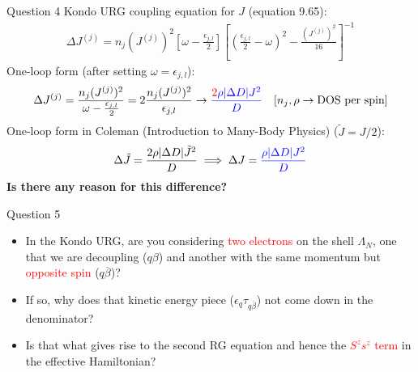 \documentclass[12pt,aspectratio=169]{beamer}
\newcommand{\qs}[1]{\textbf{\textcolor{bottlegreen}{#1}}}
\begin{document}
\begin{frame}{Question 4}
Kondo URG coupling equation for \(J\) (equation 9.65):
\begin{equation*}
\begin{aligned}
	\Delta J^{(j)}=n_{j}(J^{(j)})^{2}\left[\omega- \frac{\epsilon_{j,l}}{2}\right]\left[(\frac{\epsilon_{j,l}}{2}-\omega)^{2}-\frac{\left(J^{(j)}\right)^{2}}{16}\right]^{-1}
\end{aligned}
\end{equation*}
One-loop form (after setting \(\omega = \epsilon_{j,l}\)):
\begin{equation*}
\begin{aligned}
	\Delta J^{(j)}= \frac{n_{j}(J^{(j)})^{2}}{\omega-\frac{\epsilon_{j,l}}{2}} = 2\frac{n_{j}(J^{(j)})^{2}}{\epsilon_{j,l}} \rightarrow \textcolor{blue}{\frac{\textcolor{red}{2} \rho |\Delta D| J^2}{D}} && [n_j, \rho \rightarrow \text{DOS per spin}]
\end{aligned}
\end{equation*}
One-loop form in Coleman (Introduction to Many-Body Physics) (\(\tilde J = J/2\)):
\begin{equation*}
\begin{aligned}
	\Delta \tilde J = \frac{2 \rho |\Delta D| \tilde J^2}{D} \implies \Delta J = \textcolor{blue}{\frac{\rho |\Delta D| J^2}{D}}
\end{aligned}
\end{equation*}
\qs{Is there any reason for this difference?}
\end{frame}

\begin{frame}{Question 5}
	\begin{itemize}
		\item In the Kondo URG, are you considering \textcolor{red}{two electrons} on the shell \(\Lambda_N\), one that we are decoupling (\(q\beta\)) and another with the same momentum but \textcolor{red}{opposite spin} (\(q\overline\beta\))? \\[30pt]
		\item If so, why does that kinetic energy piece (\(\epsilon_q \tau_{q\overline\beta}\)) not come down in the denominator?\\[30pt]
		\item Is that what gives rise to the second RG equation and hence the \textcolor{red}{\(S^z s^z\) term} in the effective Hamiltonian?
	\end{itemize}
\end{frame}
\end{document}
